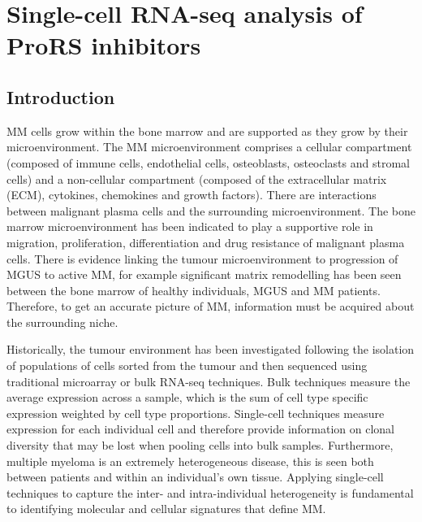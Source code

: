 \chapter{\label{ch:6-sc}Single-cell RNA-seq analysis of ProRS inhibitors}


\section{Introduction}
MM cells grow within the bone marrow and are supported as they grow by their microenvironment.
The MM microenvironment comprises a cellular compartment (composed of immune cells, endothelial cells, osteoblasts, osteoclasts and stromal cells) and a non-cellular compartment (composed of the extracellular matrix (ECM), cytokines, chemokines and growth factors)\cite{manier2012bone, kawano2015targeting}.
There are interactions between malignant plasma cells and the surrounding microenvironment.
The bone marrow microenvironment has been indicated to play a supportive role in migration, proliferation, differentiation and drug resistance of malignant plasma cells.
There is evidence linking the tumour microenvironment to progression of MGUS to active MM, for example significant matrix remodelling has been seen between the bone marrow of healthy individuals, MGUS and MM patients\cite{kawano2015targeting}.
Therefore, to get an accurate picture of MM, information must be acquired about the surrounding niche.

Historically, the tumour environment has been investigated following the isolation of populations of cells sorted from the tumour and then sequenced using traditional microarray or bulk RNA-seq techniques.
Bulk techniques measure the average expression across a sample, which is the sum of cell type specific expression weighted by cell type proportions.
Single-cell techniques measure expression for each individual cell and therefore provide information on clonal diversity that may be lost when pooling cells into bulk samples.
Furthermore, multiple myeloma is an extremely heterogeneous disease, this is seen both between patients and within an individual's own tissue.
Applying single-cell techniques to capture the inter- and intra-individual heterogeneity is fundamental to identifying molecular and cellular signatures that define MM\@.

